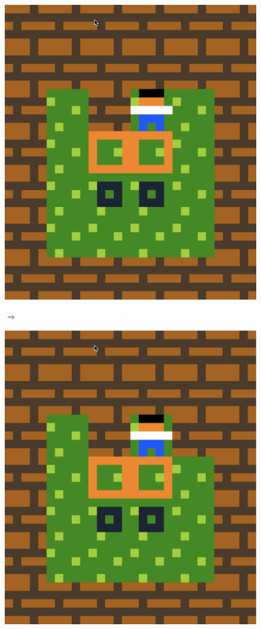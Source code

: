 \begin{figure}[!htbp]
\begin{minipage}[t]{0.2\textwidth}
\includegraphics[width=\textwidth]{figures/maxii2.png} \hfill \\
\end{minipage}
$\Longrightarrow$
\begin{minipage}[t]{0.2\textwidth}
\includegraphics[width=\textwidth]{figures/maxii3.png} \hfill \\

\end{minipage}
\end{figure}
